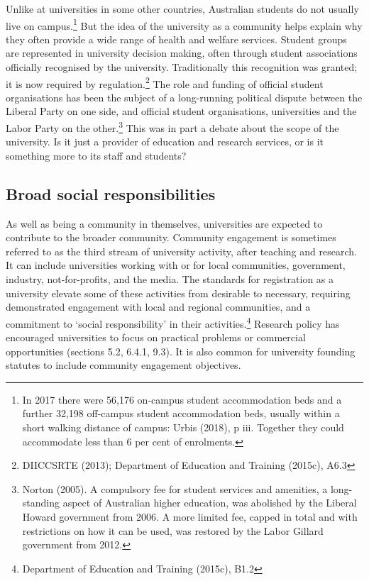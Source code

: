 \documentclass[]{book}
\begin{document}
Unlike at universities in some other countries, Australian students do not usually live on campus.\footnote{In 2017 there were 56,176 on-campus student accommodation beds and a further 32,198 off-campus student accommodation beds, usually within a short walking distance of campus: Urbis (2018), p iii. Together they could accommodate less than 6 per cent of enrolments.} But the idea of the university as a community helps explain why they often provide a wide range of health and welfare services. Student groups are represented in university decision making, often through student associations officially recognised by the university. Traditionally this recognition was granted; it is now required by regulation.\footnote{DIICCSRTE (2013); Department of Education and Training (2015c), A6.3} The role and funding of official student organisations has been the subject of a long-running political dispute between the Liberal Party on one side, and official student organisations, universities and the Labor Party on the other.\footnote{Norton (2005). A compulsory fee for student services and amenities, a long-standing aspect of Australian higher education, was abolished by the Liberal Howard government from 2006. A more limited fee, capped in total and with restrictions on how it can be used, was restored by the Labor Gillard government from 2012.} This was in part a debate about the scope of the university. Is it just a provider of education and research services, or is it something more to its staff and students?

\hypertarget{broad-social-responsibilities}{%
\subsection{Broad social responsibilities }\label{broad-social-responsibilities}}

As well as being a community in themselves, universities are expected to contribute to the broader community. Community engagement is sometimes referred to as the third stream of university activity, after teaching and research. It can include universities working with or for local communities, government, industry, not-for-profits, and the media. The standards for registration as a university elevate some of these activities from desirable to necessary, requiring demonstrated engagement with local and regional communities, and a commitment to `social responsibility' in their activities.\footnote{Department of Education and Training (2015c), B1.2} Research policy has encouraged universities to focus on practical problems or commercial opportunities (sections 5.2, 6.4.1, 9.3). It is also common for university founding statutes to include community engagement objectives.
\end{document}
